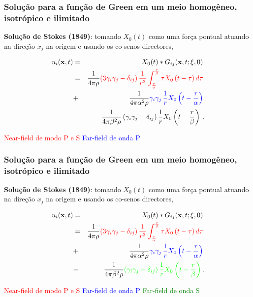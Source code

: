 \documentclass[xcolor=table]{beamer}
\newcommand{\xvec}{\mathbf{x}}
\newcommand{\xivec}{\boldmath \xi}
\begin{document}
\begin{frame}
\frametitle{\textbf{Solu\c{c}\~ao para a fun\c{c}\~ao de Green em um meio homog\^eneo, isotr\'opico e ilimitado}}

\begin{flushleft}
\textbf{Solu\c{c}\~ao de Stokes (1849)}: tomando $X_{0}(t)$ como uma for\c{c}a pontual atuando na dire\c{c}\~ao $x_j$ na origem e usando os co-senos 
directores,
\end{flushleft}
\begin{eqnarray*}
  \label{ten1}
       u_i(\xvec,t) &=& X_{0}(t) * G_{ij}(\xvec,t;\xivec,0)\, \\
       &=&\frac{1}{4\pi\rho} \textcolor{red}{\left(3\gamma_i\gamma_j -\delta_{ij} \right) \frac{1}{r^3}  \int_{ \frac{r }{\alpha}}^{ \frac{r}{\beta}} \tau X_{0}\left( t -\tau \right)  d\tau }\, \\      
       &+&\frac{1}{4\pi\alpha^2\rho} \textcolor{blue}{\gamma_i\gamma_j\, \frac{1}{r}  X_{0}\left(t - \frac{r}{\alpha} \right) }\, \\
       &-&\frac{1}{4\pi\beta^2\rho} \left(\gamma_i\gamma_j -\delta_{ij} \right)  \frac{1}{r}  X_{0}\left(t - \frac{r}{\beta} \right)\, .
\end{eqnarray*}
\begin{flushleft}
\textcolor{red}{Near-field de modo P e S}\hspace{0.5cm}
\textcolor{blue}{Far-field de onda P}
\end{flushleft}
\end{frame}%


\begin{frame}
\frametitle{\textbf{Solu\c{c}\~ao para a fun\c{c}\~ao de Green em um meio homog\^eneo, isotr\'opico e ilimitado}}

\begin{flushleft}
\textbf{Solu\c{c}\~ao de Stokes (1849)}: tomando $X_{0}(t)$ como uma for\c{c}a pontual atuando na dire\c{c}\~ao $x_j$ na origem e usando os co-senos 
directores,
\end{flushleft}
\begin{eqnarray*}
  \label{ten1}
       u_i(\xvec,t) &=& X_{0}(t) * G_{ij}(\xvec,t;\xivec,0)\, \\
       &=&\frac{1}{4\pi\rho} \textcolor{red}{\left(3\gamma_i\gamma_j -\delta_{ij} \right) \frac{1}{r^3}  \int_{ \frac{r }{\alpha}}^{ \frac{r}{\beta}} \tau X_{0}\left( t -\tau \right)  d\tau }\, \\      
       &+&\frac{1}{4\pi\alpha^2\rho} \textcolor{blue}{\gamma_i\gamma_j\, \frac{1}{r}  X_{0}\left(t - \frac{r}{\alpha} \right) }\, \\
       &-&\frac{1}{4\pi\beta^2\rho} \textcolor{green}{\left(\gamma_i\gamma_j -\delta_{ij} \right)  \frac{1}{r}  X_{0}\left(t - \frac{r}{\beta} \right) }\, .
\end{eqnarray*}
\begin{flushleft}
\textcolor{red}{Near-field de modo P e S} \hspace{0.5cm}
\textcolor{blue}{Far-field de onda P}\hspace{0.5cm}
\textcolor{green}{Far-field de onda S}
\end{flushleft}
\end{frame}%
\end{document}
